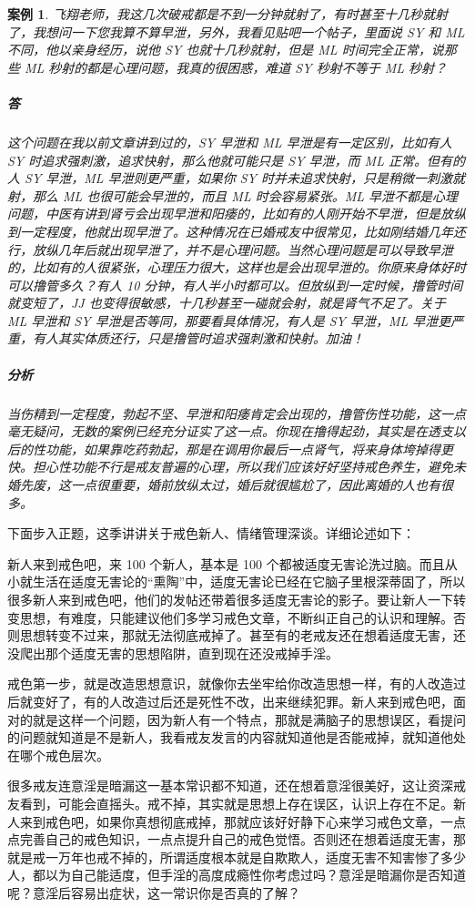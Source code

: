 \documentclass{ctexart}
\newtheorem{case}{案例}
\begin{document}
\begin{case}
    飞翔老师，我这几次破戒都是不到一分钟就射了，有时甚至十几秒就射了，我想问一下您我算不算早泄，另外，我看见贴吧一个帖子，里面说 SY 和 ML 不同，他以亲身经历，说他 SY 也就十几秒就射，但是 ML 时间完全正常，说那些 ML 秒射的都是心理问题，我真的很困惑，难道 SY 秒射不等于 ML 秒射？
    \subparagraph{答} 这个问题在我以前文章讲到过的，SY 早泄和 ML 早泄是有一定区别，比如有人 SY 时追求强刺激，追求快射，那么他就可能只是 SY 早泄，而 ML 正常。但有的人 SY 早泄，ML 早泄则更严重，如果你 SY 时并未追求快射，只是稍微一刺激就射，那么 ML 也很可能会早泄的，而且 ML 时会容易紧张。ML 早泄不都是心理问题，中医有讲到肾亏会出现早泄和阳痿的，比如有的人刚开始不早泄，但是放纵到一定程度，他就出现早泄了。这种情况在已婚戒友中很常见，比如刚结婚几年还行，放纵几年后就出现早泄了，并不是心理问题。当然心理问题是可以导致早泄的，比如有的人很紧张，心理压力很大，这样也是会出现早泄的。你原来身体好时可以撸管多久？有人 10 分钟，有人半小时都可以。但放纵到一定时候，撸管时间就变短了，JJ 也变得很敏感，十几秒甚至一碰就会射，就是肾气不足了。关于 ML 早泄和 SY 早泄是否等同，那要看具体情况，有人是 SY 早泄，ML 早泄更严重，有人其实体质还行，只是撸管时追求强刺激和快射。加油！
    \subparagraph{分析} 当伤精到一定程度，勃起不坚、早泄和阳痿肯定会出现的，撸管伤性功能，这一点毫无疑问，无数的案例已经充分证实了这一点。你现在撸得起劲，其实是在透支以后的性功能，如果靠吃药勃起，那是在调用你最后一点肾气，将来身体垮掉得更快。担心性功能不行是戒友普遍的心理，所以我们应该好好坚持戒色养生，避免未婚先废，这一点很重要，婚前放纵太过，婚后就很尴尬了，因此离婚的人也有很多。
\end{case}

下面步入正题，这季讲讲关于戒色新人、情绪管理深谈。详细论述如下：

新人来到戒色吧，来 100 个新人，基本是 100 个都被适度无害论洗过脑。而且从小就生活在适度无害论的“熏陶”中，适度无害论已经在它脑子里根深蒂固了，所以很多新人来到戒色吧，他们的发帖还带着很多适度无害论的影子。要让新人一下转变思想，有难度，只能建议他们多学习戒色文章，不断纠正自己的认识和理解。否则思想转变不过来，那就无法彻底戒掉了。甚至有的老戒友还在想着适度无害，还没爬出那个适度无害的思想陷阱，直到现在还没戒掉手淫。

戒色第一步，就是改造思想意识，就像你去坐牢给你改造思想一样，有的人改造过后就变好了，有的人改造过后还是死性不改，出来继续犯罪。新人来到戒色吧，面对的就是这样一个问题，因为新人有一个特点，那就是满脑子的思想误区，看提问的问题就知道是不是新人，我看戒友发言的内容就知道他是否能戒掉，就知道他处在哪个戒色层次。

很多戒友连意淫是暗漏这一基本常识都不知道，还在想着意淫很美好，这让资深戒友看到，可能会直摇头。戒不掉，其实就是思想上存在误区，认识上存在不足。新人来到戒色吧，如果你真想彻底戒掉，那就应该好好静下心来学习戒色文章，一点点完善自己的戒色知识，一点点提升自己的戒色觉悟。否则还在想着适度无害，那就是戒一万年也戒不掉的，所谓适度根本就是自欺欺人，适度无害不知害惨了多少人，都以为自己能适度，但手淫的高度成瘾性你考虑过吗？意淫是暗漏你是否知道呢？意淫后容易出症状，这一常识你是否真的了解？
\end{document}
